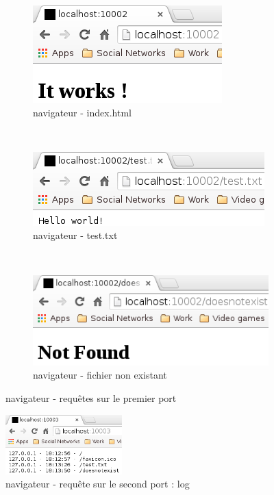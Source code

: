 \begin{figure}[h!]
        \centering
        \begin{subfigure}[b]{0.32\textwidth}
                \includegraphics[width=\textwidth]{screenshots/ex4_chrome_index.png}
                \caption{navigateur - index.html}
                \label{fig:ex5_index}
        \end{subfigure}%
        ~
        \begin{subfigure}[b]{0.32\textwidth}
                \includegraphics[width=\textwidth]{screenshots/ex4_chrome_test.png}
                \caption{navigateur - test.txt}
                \label{fig:ex5_test}
        \end{subfigure}
        ~
        \begin{subfigure}[b]{0.32\textwidth}
                \includegraphics[width=\textwidth]{screenshots/ex4_chrome_doesnotexist.png}
 	            \caption{navigateur - fichier non existant}
                \label{fig:ex5_doesnotexist}
        \end{subfigure}
        \caption{navigateur - requêtes sur le premier port}
\end{figure}

\begin{figure}[h!]
	\centering
	\includegraphics[width=0.4\textwidth]{screenshots/ex4_chrome_log.png}
	\caption{navigateur - requête sur le second port : log}
\end{figure}
